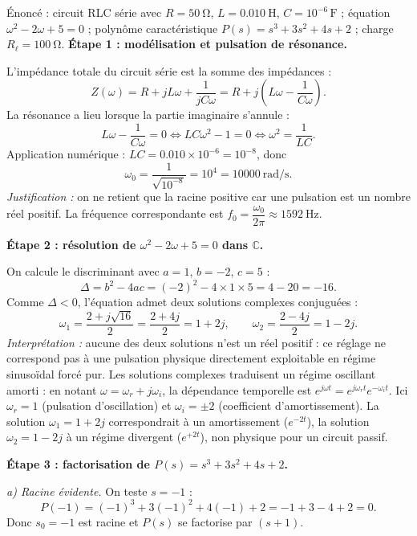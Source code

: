 \documentclass[11pt]{article}
\begin{document}
\begin{exoresolu}
Énoncé : circuit RLC série avec $R = \SI{50}{\ohm}$, $L = \SI{0,010}{\henry}$, $C = 10^{-6}\,\si{\farad}$ ; équation $\omega^2 - 2\omega + 5 = 0$ ; polynôme caractéristique $P(s) = s^3 + 3s^2 + 4s + 2$ ; charge $R_\ell = \SI{100}{\ohm}$.
\tcblower
\textbf{Étape 1 : modélisation et pulsation de résonance.}

L'impédance totale du circuit série est la somme des impédances :
\[ Z(\omega) = R + jL\omega + \frac{1}{jC\omega} = R + j\left(L\omega - \frac{1}{C\omega}\right). \]
La résonance a lieu lorsque la partie imaginaire s'annule :
\[ L\omega - \frac{1}{C\omega} = 0 \iff LC\omega^2 - 1 = 0 \iff \omega^2 = \frac{1}{LC}. \]
Application numérique : $LC = \num{0,010} \times 10^{-6} = 10^{-8}$, donc
\[ \omega_0 = \frac{1}{\sqrt{10^{-8}}} = 10^{4} = \SI{10000}{\radian\per\second}. \]
\emph{Justification :} on ne retient que la racine positive car une pulsation est un nombre réel positif. La fréquence correspondante est $f_0 = \dfrac{\omega_0}{2\pi} \approx \SI{1592}{\hertz}$.

\textbf{Étape 2 : résolution de $\omega^2 - 2\omega + 5 = 0$ dans $\mathbb{C}$.}

On calcule le discriminant avec $a = 1$, $b = -2$, $c = 5$ :
\[ \Delta = b^2 - 4ac = (-2)^2 - 4 \times 1 \times 5 = 4 - 20 = -16. \]
Comme $\Delta < 0$, l'équation admet deux solutions complexes conjuguées :
\[ \omega_1 = \frac{2 + j\sqrt{16}}{2} = \frac{2 + 4j}{2} = 1 + 2j, \qquad \omega_2 = \frac{2 - 4j}{2} = 1 - 2j. \]
\emph{Interprétation :} aucune des deux solutions n'est un réel positif : ce réglage ne correspond pas à une pulsation physique directement exploitable en régime sinusoïdal forcé pur. Les solutions complexes traduisent un régime oscillant amorti : en notant $\omega = \omega_r + j\omega_i$, la dépendance temporelle est $e^{j\omega t} = e^{j\omega_r t}e^{-\omega_i t}$. Ici $\omega_r = 1$ (pulsation d'oscillation) et $\omega_i = \pm 2$ (coefficient d'amortissement). La solution $\omega_1 = 1+2j$ correspondrait à un amortissement ($e^{-2t}$), la solution $\omega_2 = 1-2j$ à un régime divergent ($e^{+2t}$), non physique pour un circuit passif.

\textbf{Étape 3 : factorisation de $P(s) = s^3 + 3s^2 + 4s + 2$.}

\emph{a) Racine évidente.} On teste $s = -1$ :
\[ P(-1) = (-1)^3 + 3(-1)^2 + 4(-1) + 2 = -1 + 3 - 4 + 2 = 0. \]
Donc $s_0 = -1$ est racine et $P(s)$ se factorise par $(s+1)$.


\end{exoresolu}
\end{document}
